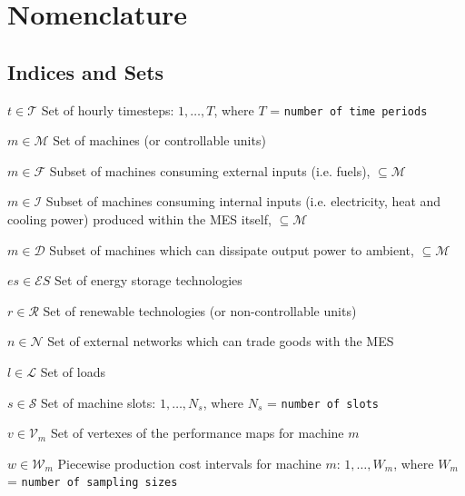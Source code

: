 \documentclass{article}
\newcommand{\cT}{{\mathcal T}}
\newcommand{\cM}{{\mathcal M}}
\newcommand{\cP}{{\mathcal P}}
\newcommand{\cQ}{{\mathcal Q}}
\newcommand{\cC}{{\mathcal C}}
\newcommand{\cF}{{\mathcal F}}
\newcommand{\cI}{{\mathcal I}}
\newcommand{\cD}{{\mathcal D}}
\newcommand{\cS}{{\mathcal S}}
\newcommand{\cR}{{\mathcal R}}
\newcommand{\cES}{{\mathcal ES}}
\newcommand{\cN}{{\mathcal N}}
\newcommand{\cL}{{\mathcal L}}
\newcommand{\cV}{{\mathcal V}}
\newcommand{\cG}{{\mathcal G}}
\newcommand{\cW}{{\mathcal W}}
\newcommand\mydescriptionopt{
	\IEEEsetlabelwidth{$g \in \cG_{\textit{off}}^0$]}
	\IEEEusemathlabelsep
}
\begin{document}
\section{Nomenclature}

\subsection{Indices and Sets}
\begin{IEEEdescription}[\mydescriptionopt] 
	\item[$t \in \cT$] Set of hourly timesteps: $1, \ldots, T$, where $T$ = {\tt number of time periods}
	\item[$m \in \cM$] Set of machines (or controllable units)

	\item[$m \in \cF$] Subset of machines consuming external inputs (i.e. fuels), $\subseteq \cM$
	\item[$m \in \cI$] Subset of machines consuming internal inputs (i.e. electricity, heat and cooling power) produced within the MES itself, $\subseteq \cM$

	\item[$m \in \cD$] Subset of machines which can dissipate output power to ambient, $\subseteq \cM$
	
	\item[$es \in \cES$] Set of energy storage technologies
	
	\item[$r \in \cR$] Set of renewable technologies (or non-controllable units)
	
	\item[$n \in \cN$] Set of external networks which can trade goods with the MES
		
	\item[$l \in \cL$] Set of loads
	
	\item[$s \in \cS$] Set of machine slots: $1, \ldots, N_{s}$, where $N_{s}$ = {\tt number of slots}
	
	\item[$v \in \cV_{m}$] Set of vertexes of the performance maps for machine $m$
	
	\item[$w \in \cW_m$] Piecewise production cost intervals for machine $m$: $1, \ldots, W_m$, where $W_m$ = {\tt 			    number of sampling sizes}

\end{IEEEdescription}
\end{document}
